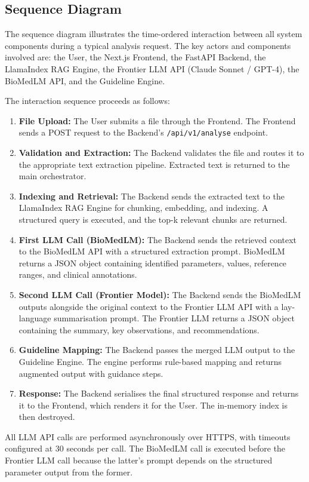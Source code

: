 \documentclass[12pt,a4paper]{report}
\begin{document}
\subsection{Sequence Diagram}
The sequence diagram illustrates the time-ordered interaction between all system components during a typical analysis request. The key actors and components involved are: the User, the Next.js Frontend, the FastAPI Backend, the LlamaIndex RAG Engine, the Frontier LLM API (Claude Sonnet / GPT-4), the BioMedLM API, and the Guideline Engine.

The interaction sequence proceeds as follows:

\begin{enumerate}
    \item \textbf{File Upload:} The User submits a file through the Frontend. The Frontend sends a POST request to the Backend's \texttt{/api/v1/analyse} endpoint.
    \item \textbf{Validation and Extraction:} The Backend validates the file and routes it to the appropriate text extraction pipeline. Extracted text is returned to the main orchestrator.
    \item \textbf{Indexing and Retrieval:} The Backend sends the extracted text to the LlamaIndex RAG Engine for chunking, embedding, and indexing. A structured query is executed, and the top-k relevant chunks are returned.
    \item \textbf{First LLM Call (BioMedLM):} The Backend sends the retrieved context to the BioMedLM API with a structured extraction prompt. BioMedLM returns a JSON object containing identified parameters, values, reference ranges, and clinical annotations.
    \item \textbf{Second LLM Call (Frontier Model):} The Backend sends the BioMedLM outputs alongside the original context to the Frontier LLM API with a lay-language summarisation prompt. The Frontier LLM returns a JSON object containing the summary, key observations, and recommendations.
    \item \textbf{Guideline Mapping:} The Backend passes the merged LLM output to the Guideline Engine. The engine performs rule-based mapping and returns augmented output with guidance steps.
    \item \textbf{Response:} The Backend serialises the final structured response and returns it to the Frontend, which renders it for the User. The in-memory index is then destroyed.
\end{enumerate}

All LLM API calls are performed asynchronously over HTTPS, with timeouts configured at 30 seconds per call. The BioMedLM call is executed before the Frontier LLM call because the latter's prompt depends on the structured parameter output from the former.
\end{document}
